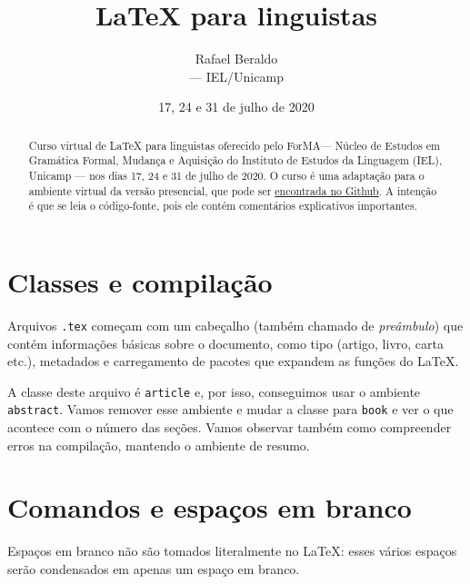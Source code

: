 \documentclass[10pt,a4paper,oneside]{article}
\title{\LaTeX{} para linguistas}
\author{Rafael Beraldo\\ \ForMA — IEL/Unicamp}
\date{17, 24 e 31 de julho de 2020}
\newcommand\ForMA{\textsf{ForMA}\xspace}
\begin{document}
\frenchspacing

\maketitle

\begin{abstract}
  Curso virtual de \LaTeX{} para linguistas oferecido pelo \ForMA — Núcleo de Estudos em Gramática Formal, Mudança e Aquisição do Instituto de Estudos da Linguagem (IEL), Unicamp — nos dias 17, 24 e 31 de julho de 2020. O curso é uma adaptação para o ambiente virtual da versão presencial, que pode ser \href{https://github.com/rberaldo/workshop-latex-forma}{encontrada no Github}. A intenção é que se leia o código-fonte, pois ele contém comentários explicativos importantes.
\end{abstract}

\tableofcontents

\section{Classes e compilação}

Arquivos \texttt{.tex} começam com um cabeçalho (também chamado de \emph{preâmbulo}) que contém informações básicas sobre o documento, como tipo (artigo, livro, carta etc.), metadados e carregamento de pacotes que expandem as funções do \LaTeX.

A classe deste arquivo é \texttt{article} e, por isso, conseguimos usar o ambiente \texttt{abstract}. Vamos remover esse ambiente e mudar a classe para \texttt{book} e ver o que acontece com o número das seções. Vamos observar também como compreender erros na compilação, mantendo o ambiente de resumo.

\section{Comandos e espaços em branco}

Espaços em branco não são tomados literalmente no \LaTeX:     esses       vários    espaços         serão       condensados      em apenas     um espaço    em branco.
\end{document}
